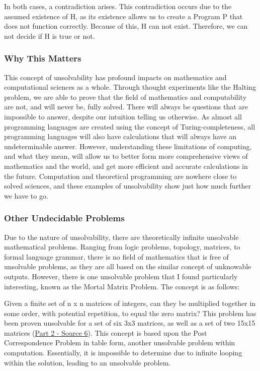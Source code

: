 \documentclass{article}
\begin{document}
    \medskip\noindent In both cases, a contradiction arises. This contradiction occurs due to the assumed existence of H, as its existence allows us to create a Program P that does not function correctly. Because of this, H can not exist. Therefore, we can not decide if H is true or not. 
    
    \subsubsection{Why This Matters}
    
    \medskip\noindent This concept of unsolvability has profound impacts on mathematics and computational sciences as a whole. Through thought experiments like the Halting problem, we are able to prove that the field of mathematics and computability are not, and will never be, fully solved. There will always be questions that are impossible to answer, despite our intuition telling us otherwise. As almost all programming languages are created using the concept of Turing-completeness, all programming languages will also have calculations that will always have an undeterminable answer. However, understanding these limitations of computing, and what they mean, will allow us to better form more comprehensive views of mathematics and the world, and get more efficient and accurate calculations in the future. Computation and theoretical programming are nowhere close to solved sciences, and these examples of unsolvability show just how much further we have to go.   
    
    \subsubsection{Other Undecidable Problems}
    \medskip\noindent Due to the nature of unsolvability, there are theoretically infinite unsolvable mathematical problems. Ranging from logic problems, topology, matrices, to formal language grammar, there is no field of mathematics that is free of unsolvable problems, as they are all based on the similar concept of unknowable outputs. However, there is one unsolvable problem that I found particularly interesting, known as the Mortal Matrix Problem. The concept is as follows: 
    
    \medskip\noindent Given a finite set of n x n matrices of integers, can they be multiplied together in some order, with potential repetition, to equal the zero matrix? This problem has been proven unsolvable for a set of six 3x3 matrices, as well as a set of two 15x15 matrices (\href {https://citeseerx.ist.psu.edu/viewdoc/download?doi=10.1.1.54.45&rep=rep1&type=pdf}{Part 2 - Source 6}). This concept is based upon the Post Correspondence Problem in table form, another unsolvable problem within computation. Essentially, it is impossible to determine due to infinite looping within the solution, leading to an unsolvable problem.
    
\end{document}
